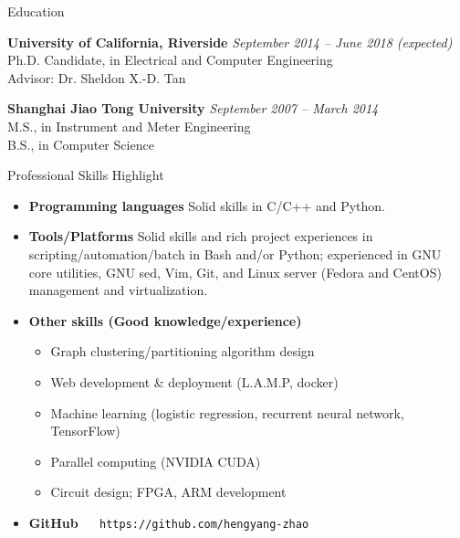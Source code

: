 \documentclass{resume} %
\begin{document}

\begin{rSection}{Education}

{\bf University of California, Riverside} \hfill {\em September 2014 -- June 2018 (expected)} \\
Ph.D. Candidate, in Electrical and Computer Engineering \\
Advisor: Dr. Sheldon X.-D. Tan

{\bf Shanghai Jiao Tong University} \hfill {\em September 2007 -- March 2014} \\
M.S., in Instrument and Meter Engineering\\
B.S., in Computer Science

\end{rSection}

\begin{rSection}{Professional Skills Highlight}

    \begin{itemize}

        \item \textbf{Programming languages} Solid skills in C/C++ and Python.

        \item \textbf{Tools/Platforms} Solid skills and rich project
            experiences in scripting/automation/batch in Bash and/or Python;
            experienced in GNU core utilities, GNU sed, Vim, Git, and Linux
            server (Fedora and CentOS) management and virtualization.

        \item \textbf{Other skills (Good knowledge/experience)}

            \begin{itemize}
                \item Graph clustering/partitioning algorithm design
                \item Web development \& deployment (L.A.M.P, docker)
                \item Machine learning (logistic regression, recurrent neural network, TensorFlow)
                \item Parallel computing (NVIDIA CUDA)
                \item Circuit design; FPGA, ARM development
            \end{itemize}

        \item \textbf{GitHub} $\quad$ \texttt{https://github.com/hengyang-zhao}

    \end{itemize}

\end{rSection}
\end{document}
